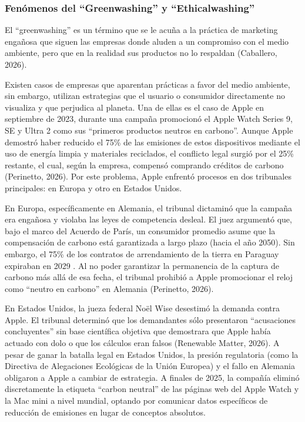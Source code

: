 \documentclass[stu,12pt,a4paper]{apa7}
\begin{document}
    \subsubsection{Fenómenos del “Greenwashing” y “Ethicalwashing”}
El “greenwashing” es un término que se le acuña a la práctica de marketing engañosa que siguen las empresas donde aluden a un compromiso con el medio ambiente, pero que en la realidad sus productos no lo respaldan (Caballero, 2026).

Existen casos de empresas que aparentan prácticas a favor del medio ambiente, sin embargo, utilizan estrategias que el usuario o consumidor directamente no visualiza y que perjudica al planeta. Una de ellas es el caso de Apple en septiembre de 2023, durante una campaña promocionó el Apple Watch Series 9, SE y Ultra 2 como sus ``primeros productos neutros en carbono''. Aunque Apple demostró haber reducido el 75\% de las emisiones de estos dispositivos mediante el uso de energía limpia y materiales reciclados, el conflicto legal surgió por el 25\% restante, el cual, según la empresa, compensó comprando créditos de carbono (Perinetto, 2026). Por este problema, Apple enfrentó procesos en dos tribunales principales: en Europa y otro en Estados Unidos.

En Europa, específicamente en Alemania, el tribunal dictaminó que la campaña era engañosa y violaba las leyes de competencia desleal. El juez argumentó que, bajo el marco del Acuerdo de París, un consumidor promedio asume que la compensación de carbono está garantizada a largo plazo (hacia el año 2050). Sin embargo, el 75\% de los contratos de arrendamiento de la tierra en Paraguay expiraban en 2029 . Al no poder garantizar la permanencia de la captura de carbono más allá de esa fecha, el tribunal prohibió a Apple promocionar el reloj como ``neutro en carbono'' en Alemania (Perinetto, 2026).

En Estados Unidos, la jueza federal Noël Wise desestimó la demanda contra Apple. El tribunal determinó que los demandantes sólo presentaron ``acusaciones concluyentes'' sin base científica objetiva que demostrara que Apple había actuado con dolo o que los cálculos eran falsos (Renewable Matter, 2026). A pesar de ganar la batalla legal en Estados Unidos, la presión regulatoria (como la Directiva de Alegaciones Ecológicas de la Unión Europea) y el fallo en Alemania obligaron a Apple a cambiar de estrategia. A finales de 2025, la compañía eliminó discretamente la etiqueta ``carbon neutral'' de las páginas web del Apple Watch y la Mac mini a nivel mundial, optando por comunicar datos específicos de reducción de emisiones en lugar de conceptos absolutos.
\end{document}
